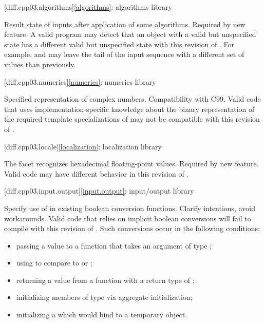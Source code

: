 [diff.cpp03.algorithms]{\ref*{algorithms}: algorithms library}

\change
Result state of inputs after application of some algorithms.
\rationale
Required by new feature.
\effect
A valid \CppIII{} program may detect that an object with a valid but
unspecified state has a different valid but unspecified state with this
revision of \Cpp{}. For example,  and
 may leave the tail of the input sequence with a
different set of values than previously.

[diff.cpp03.numerics]{\ref*{numerics}: numerics library}

\change
Specified representation of complex numbers.
\rationale
Compatibility with C99.
\effect
Valid \CppIII{} code that uses implementation-specific knowledge about the
binary representation of the required template specializations of
 may not be compatible with this revision of \Cpp{}.

[diff.cpp03.locale]{\ref*{localization}: localization library}

\change
The  facet recognizes hexadecimal floating-point values.
\rationale
Required by new feature.
\effect
Valid \CppIII{} code may have different behavior in this revision of \Cpp{}.

[diff.cpp03.input.output]{\ref*{input.output}: input/output library}

\change
Specify use of  in existing boolean conversion functions.
\rationale
Clarify intentions, avoid workarounds.
\effect
Valid \CppIII{} code that relies on implicit boolean conversions will fail to
compile with this revision of \Cpp{}. Such conversions occur in the
following conditions:

\begin{itemize}
\item passing a value to a function that takes an argument of type ;
\item using  to compare to  or ;
\item returning a value from a function with a return type of ;
\item initializing members of type  via aggregate initialization;
\item initializing a  which would bind to a temporary object.
\end{itemize}

